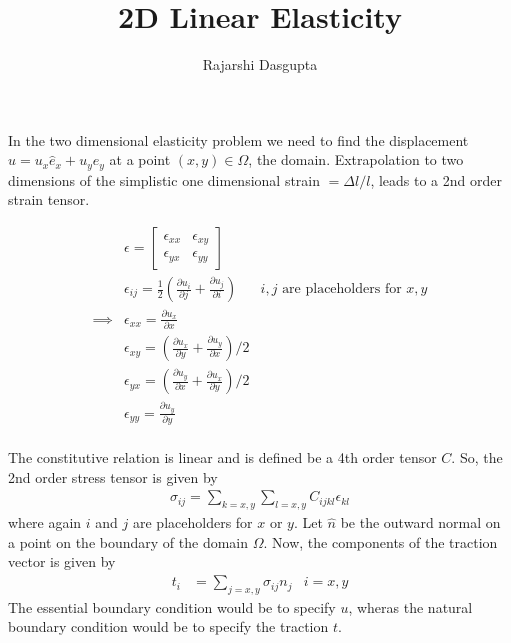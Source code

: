 \documentclass{article}
\title{2D Linear Elasticity}
\author{
	Rajarshi Dasgupta
	}
\newcommand{\pder}[2]{\frac{\partial #1}{\partial #2}}
\begin{document}
\maketitle

In the two dimensional elasticity problem
we need to find the displacement $u = u_x \hat{e}_x + u_y \hat{e}_y$
at a point $(x,y) \in \Omega$, the domain.
Extrapolation to two dimensions
of the simplistic one dimensional strain $= \Delta l / l$,
leads to a 2nd order strain tensor.

\begin{align*}
  & \epsilon = 
  \begin{bmatrix}
    \epsilon_{xx} & \epsilon_{xy} \\ \epsilon_{yx} & \epsilon_{yy}
  \end{bmatrix} \\
  & \epsilon_{ij} = \frac{1}{2} \left( \pder{u_i}{j} + \pder{u_j}{i} \right)
  & i,j \mbox{ are placeholders for } x,y\\
  \implies & \epsilon_{xx} = \pder{u_x}{x} \\
  & \epsilon_{xy} = \left( \pder{u_x}{y} + \pder{u_y}{x} \right)/2\\
  & \epsilon_{yx} = \left( \pder{u_y}{x} + \pder{u_x}{y} \right)/2\\
  & \epsilon_{yy} = \pder{u_y}{y} \\
\end{align*}

The constitutive relation is linear
and is defined be a 4th order tensor $C$.
So, the 2nd order stress tensor is given by
\begin{align*}
  \sigma_{ij} = \sum_{k=x,y} \sum_{l=x,y} C_{ijkl} \epsilon_{kl}
\end{align*}
where again $i$ and $j$ are placeholders for $x$ or $y$.
Let $\hat{n}$ be the outward normal on a point on the boundary
of the domain $\Omega$.
Now, the components of the traction vector is given by
\begin{align*}
  t_i & = \sum_{j=x,y} \sigma_{ij} n_j & i=x,y
\end{align*}
The essential boundary condition
would be to specify $u$,
wheras the natural boundary condition
would be to specify the traction $t$.
\end{document}
